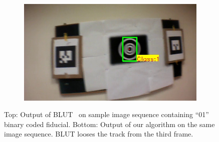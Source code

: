 \documentclass[10pt,twocolumn,letterpaper]{article}
\begin{document}
\begin{figure}
\begin{subfigure}[b]{.19\textwidth}
\end{subfigure}
\begin{subfigure}[b]{.19\textwidth}
\includegraphics[width=\linewidth]{BLUT_input_01/output15.jpg}
\end{subfigure}
\caption{Top: Output of BLUT~\cite{Wu:2011} on sample image sequence containing
``01'' binary coded fiducial. Bottom: Output of our algorithm on the same image
sequence. BLUT looses the track from the third frame.}
\label{fig:BLUT_compare_01}
\end{figure}
\end{document}

